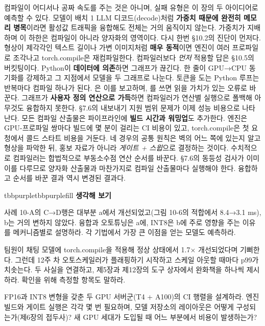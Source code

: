 컴파일이 어디서나 공짜 속도를 주는 것은 아니며, 실패 유형은 이 장의 두 아이디어로 예측할 수 있다. 모델이 배치 1 LLM 디코드(decode)처럼 \textbf{가중치 때문에 완전히 메모리 병목}이라면 활성값 트래픽을 융합해도 전체는 거의 움직이지 않는다. 가중치가 지배하며 이 하한은 컴파일이 아니라 양자화의 영역이다. 다시 한번 §10.2의 진단이 먼저다. 형상이 제각각인 텍스트 길이나 가변 이미지처럼 \textbf{매우 동적}이면 엔진이 여러 프로파일로 조각나고 torch.compile은 재컴파일한다. 컴파일러보다 \textit{먼저} 적용할 답은 §10.5의 버킷팅이다. Python이 \textbf{데이터에 의존}하면 그래프가 끊긴다.  한 줄이 GPU→CPU 동기화를 강제하고 그 지점에서 모델을 두 그래프로 나눈다. 토큰을 도는 Python 루프는 반복마다 컴파일 하나가 된다. 은 이를 보고하며, 를 쓰면 읽을 가치가 있는 오류로 바꾼다. 그래프가 \textbf{사용자 정의 연산으로 가득}하면 컴파일러가 연산별 실행으로 폴백해 아무것도 융합하지 못한다. §7.6의 내보내기 지원 범위 문제가 이제 성능 비용으로 나타난다. 모든 컴파일 산출물은 파이프라인에 \textbf{빌드 시간과 워밍업}도 추가한다. 엔진은 GPU-프로파일 쌍마다 빌드에 몇 분이 걸리는 CI 비용이 있고, torch.compile은 첫 요청에서 콜드 스타트 비용을 거둔다. 네 경우의 공통 원칙은 벽의 어느 쪽에 있는지 알고 형상을 파악한 뒤, 홍보 자료가 아니라 \textit{게이트 + 스윕}으로 결정하는 것이다. 수치적으로 컴파일러는 합법적으로 부동소수점 연산 순서를 바꾼다. §7.6의 동등성 검사가 이미 이를 다루므로 양자화 산출물과 마찬가지로 컴파일 산출물마다 실행해야 한다. 융합하고 순서를 바꾼 결과 역시 변경된 결과다.

\begin{calloutbox}{tbbpurple}{tbbpurplefill}
{\normalsize\bfseries\color{tbbpurple}생각해 보기}\par\vspace{3pt}
\begin{tbbitemize}
  \item 사례 10-A의 C→D행은 대부분 a에서 개선되었고(그림 10-6의 적합에서 8.4→3.1 ms), b는 거의 변하지 않았다. 융합과 오토튜닝은 a에, INT8은 b에 주로 영향을 주는 이유를 메커니즘별로 설명하라. 각 기법에서 가장 큰 이점을 얻는 모델도 예측하라.
  \item 팀원이 채팅 모델에 torch.compile을 적용해 정상 상태에서 1.7× 개선되었다며 기뻐한다. 그런데 12주 차 오토스케일러가 플래핑하기 시작하고 스케일 아웃할 때마다 p99가 치솟는다. 두 사실을 연결하고, 제5장과 제12장의 도구 상자에서 완화책을 하나씩 제시하라. 확인을 위해 측정할 항목도 말하라.
  \item FP16과 INT8 변형을 갖춘 두 GPU 서버군(T4 + A100)의 CI 행렬을 설계하라. 엔진 빌드와 게이트 실행은 각각 몇 번 필요하며, 모델 저장소의 레이아웃은 어떻게 구성되는가(제6장의 접두사)? 새 GPU 세대가 도입될 때 어느 부분에서 비용이 발생하는가?
\end{tbbitemize}
\end{calloutbox}

